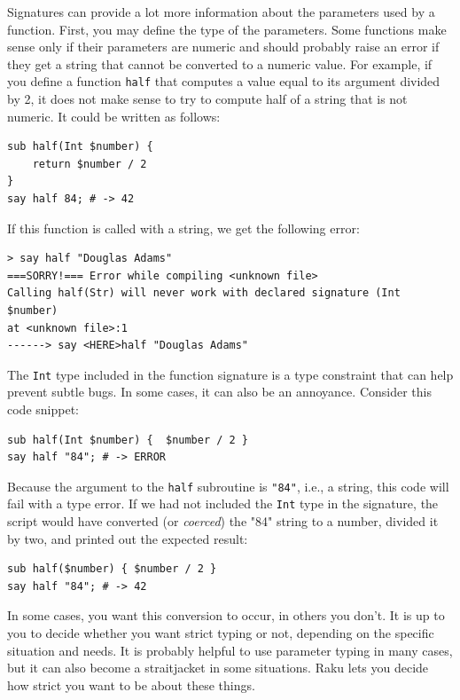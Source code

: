 Signatures can provide a lot more information about the 
parameters used by a function. First, you may define the 
type of the parameters. Some functions make sense only if their 
parameters are numeric and should probably raise an error if 
they get a string that cannot be converted to a numeric value. 
For example, if you define a function {\tt half} that computes 
a value equal to its argument divided by 2, it does not make 
sense to try to compute half of a string that is not numeric. 
It could be written as follows:

\begin{verbatim}
sub half(Int $number) { 
    return $number / 2 
}
say half 84; # -> 42
\end{verbatim}

If this function is called with a string, we get the 
following error:

\begin{verbatim}
> say half "Douglas Adams"
===SORRY!=== Error while compiling <unknown file>
Calling half(Str) will never work with declared signature (Int $number)
at <unknown file>:1
------> say <HERE>half "Douglas Adams"
\end{verbatim}

The {\tt Int} type included in the function signature is a type 
constraint that can help prevent subtle bugs. In some cases, 
it can also be an annoyance. Consider this code snippet:


\begin{verbatim}
sub half(Int $number) {  $number / 2 }
say half "84"; # -> ERROR
\end{verbatim}

Because the argument to the {\tt half} subroutine is {\tt "84"}, 
i.e., a string, this code will fail with a type error. If we had 
not included the {\tt Int} type in the signature, the script 
would have converted (or \emph{coerced}) the "84" string to 
a number, divided it by two, and printed out the expected result:

\begin{verbatim}
sub half($number) { $number / 2 }
say half "84"; # -> 42
\end{verbatim}

In some cases, you want this conversion to occur, in others 
you don't. It is up to you to decide whether you want 
strict typing or not, depending on the specific situation and
needs. It is probably helpful to use parameter typing in many 
cases, but it can also become a straitjacket in some situations. 
Raku lets you decide how strict you want to be about these things.


